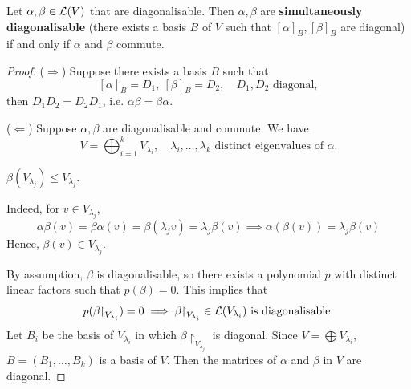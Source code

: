 \documentclass[a4paper,11pt]{article}
\begin{document}
\begin{theorem}
	Let $ \alpha, \beta \in {\mathcal{L}}(V)$ that are diagonalisable.
	Then $ \alpha, \beta $ are \textbf{simultaneously diagonalisable} (there exists a basis $ B $ of $ V $ such that $ [\alpha]_B, [\beta]_B $ are diagonal) if and only if $ \alpha $ and $ \beta $ commute.
\end{theorem}
\begin{proof}
	($ \Rightarrow $)
	Suppose there exists a basis $B$ such that 
	\[
		[\alpha]_{B} = D_1,\ [\beta]_B = D_2,\quad D_1,D_2 \text{ diagonal}, 
	\]
	then $ D_1D_2 = D_2D_1 $, i.e. $ \alpha \beta = \beta \alpha $. 

	($ \Leftarrow $)
	Suppose $\alpha,\beta$ are diagonalisable and commute. We have
	\[
		V = \bigoplus_{i=1}^k V_{\lambda_i},\quad \lambda_i, \dots, \lambda_k \text{ distinct eigenvalues of } \alpha. 
	\]
	\begin{claim}
		$ \beta(V_{\lambda_j}) \le V_{\lambda_j} $. 
	\end{claim}
	Indeed, for $ v \in V_{\lambda_j} $,
	\[
		\alpha \beta(v) = \beta \alpha(v) = \beta(\lambda_j v) = \lambda_j \beta(v) \implies \alpha(\beta(v)) = \lambda_j \beta(v)
	\]
	Hence, $ \beta(v) \in V_{\lambda_j} $. 

	By assumption, $ \beta $ is diagonalisable, so there exists a polynomial $ p $ with distinct linear factors such that $ p(\beta) = 0 $. This implies that
	\[
		p(\beta \mathord{\upharpoonright}_{V_{\lambda_i}}) = 0 \implies \beta \mathord{\upharpoonright}_{V_{\lambda_i}}\in {\mathcal{L}}(V_{\lambda_i}) \text{ is diagonalisable.}
	\]
	Let $ B_i $ be the basis of $ V_{\lambda_i} $ in which $ \beta\restriction_{V_{\lambda_j}} $ is diagonal.
	Since $ V = \bigoplus V_{\lambda_i} $, $ B = (B_1, \dots, B_k) $ is a basis of $ V $.
	Then the matrices of $ \alpha $ and $ \beta $ in $ V $ are diagonal.
\end{proof}
\end{document}
